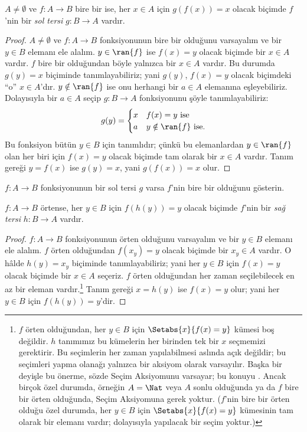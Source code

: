 \begin{prop}
$A\neq\emptyset$ ve $f\colon A \to B$ bire bir ise, her $x \in A$ için
$g(f(x))=x$ olacak biçimde $f$'nin bir \emph{sol tersi}
$g\colon B \to A$ vardır.
\end{prop}

\begin{proof}
$A\neq\emptyset$ ve $f\colon A \to B$ fonksiyonunun bire bir olduğunu
varsayalım ve bir
$y \in B$ elemanı ele alalım. $y \in \ran{f}$ ise $f(x)=y$ olacak biçimde bir
$x \in A$ vardır. $f$ bire bir olduğundan böyle yalnızca bir $x \in A$ vardır.
Bu durumda $g(y)=x$ biçiminde tanımlayabiliriz; yani $g(y)$, $f(x)=y$ olacak
biçimdeki ``o'' $x \in A$'dır. $y \notin \ran{f}$ ise onu herhangi bir
$a \in A$ elemanına eşleyebiliriz. Dolayısıyla bir $a \in A$ seçip
$g\colon B \to A$ fonksiyonunu şöyle tanımlayabiliriz:
\[
g(y) = \begin{cases}
    x & \text{$f(x) = y$ ise}\\
    a & \text{$y \notin \ran{f}$ ise.}
\end{cases}
\]
Bu fonksiyon bütün $y \in B$ için tanımlıdır; çünkü bu elemanlardan
$y \in \ran{f}$ olan her biri için $f(x)=y$ olacak biçimde tam olarak bir
$x \in A$ vardır. Tanım gereği $y=f(x)$ ise $g(y)=x$, yani $g(f(x))=x$ olur.
\end{proof}

\begin{prob}
$f\colon A \to B$ fonksiyonunun bir sol tersi $g$ varsa $f$'nin bire bir
olduğunu gösterin.
\end{prob}

\begin{prop}
    $f\colon A \to B$ örtense, her $y \in B$ için $f(h(y))=y$ olacak biçimde
    $f$'nin bir \emph{sağ tersi} $h\colon B \to A$ vardır.
\end{prop}

\begin{proof}
$f\colon A \to B$ fonksiyonunun örten olduğunu varsayalım ve bir $y \in B$
elemanı ele alalım. $f$ örten olduğundan $f(x_y)=y$ olacak biçimde bir
$x_y \in A$ vardır. O hâlde $h(y)=x_y$ biçiminde tanımlayabiliriz; yani her
$y \in B$ için $f(x)=y$ olacak biçimde bir $x \in A$ seçeriz. $f$ örten
olduğundan her zaman seçilebilecek en az bir eleman vardır.\footnote{$f$ örten
olduğundan, her $y \in B$ için $\Setabs{x}{f(x) = y}$ kümesi boş değildir.
$h$ tanımımız bu kümelerin her birinden tek bir $x$ seçmemizi gerektirir. Bu
seçimlerin her zaman yapılabilmesi aslında açık değildir; bu seçimleri yapma
olanağı yalnızca bir aksiyom olarak varsayılır. Başka bir deyişle bu önerme,
sözde Seçim Aksiyomunu varsayar; bu konuyu
. Ancak birçok özel durumda,
örneğin $A=\Nat$ veya $A$ sonlu olduğunda ya da $f$ bire bir örten olduğunda,
Seçim Aksiyomuna gerek yoktur. ($f$'nin bire bir örten olduğu özel durumda,
her $y \in B$ için $\Setabs{x}{f(x) = y}$ kümesinin tam olarak bir elemanı
vardır; dolayısıyla yapılacak bir seçim yoktur.)}
Tanım gereği $x=h(y)$ ise $f(x)=y$ olur; yani her $y \in B$ için
$f(h(y))=y$'dir.
\end{proof}

